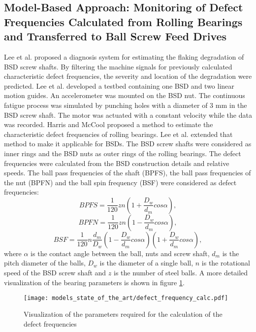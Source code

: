 \subsection{Model-Based Approach: Monitoring of Defect Frequencies Calculated from Rolling Bearings and Transferred to Ball Screw Feed Drives}
Lee et al. \cite{Lee2015} proposed a diagnosis system for estimating the flaking degradation of BSD screw shafts. By filtering the machine signals for previously calculated characteristic defect frequencies, the severity and location of the degradation were predicted. Lee et al. developed a testbed containing one BSD and two linear motion guides. An accelerometer was mounted on the BSD nut. The continuous fatigue process was simulated by punching holes with a diameter of 3 mm in the BSD screw shaft. The motor was actuated with a constant velocity while the data was recorded. Harris and McCool \cite{Harris1996} proposed a method to estimate the characteristic defect frequencies of rolling bearings. Lee et al. \cite{Lee2015} extended that method to make it applicable for BSDs. The BSD screw shafts were considered as inner rings and the BSD nuts as outer rings of the rolling bearings. The defect frequencies were calculated from the BSD construction details and relative speeds. The ball pass frequencies of the shaft (BPFS), the ball pass frequencies of the nut (BPFN) and the ball spin frequency (BSF) were considered as defect frequencies: 
\begin{equation}
    BPFS = \frac{1}{120}zn(1+\frac{D_{w}}{d_{m}}cos\alpha),
    \label{eq:defect_frequency}
\end{equation}
\begin{equation}
    BPFN = \frac{1}{120}zn(1-\frac{D_{w}}{d_{m}}cos\alpha),
\end{equation}
\begin{equation}
    BSF = \frac{1}{120}n\frac{d_{m}}{D_{w}} (1-\frac{D_{w}}{d_{m}}cos\alpha)(1+\frac{D_{w}}{d_{m}}cos\alpha) ,
\end{equation}
where $\alpha$ is the contact angle between the ball, nuts and screw shaft, $d_{m}$ is the pitch diameter of the balls, $D_{w}$ is the diameter of a single ball, $n$ is the rotational speed of the BSD screw shaft and $z$ is the number of steel balls. A more detailed visualization of the bearing parameters is shown in figure \ref{fig:defect_frequency_calc}. 

\begin{figure}[H]
  \centering
  \texttt{[image: models\_state\_of\_the\_art/defect\_frequency\_calc.pdf]}
  \caption{Visualization of the parameters required for the calculation of the defect frequencies \cite{Lee2015}}
  \label{fig:defect_frequency_calc}
\end{figure}

